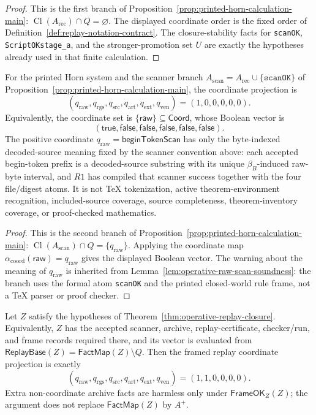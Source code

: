 \documentclass[runningheads]{llncs}
\newcommand{\FactMap}{\mathsf{FactMap}}
\newcommand{\ReplayBase}{\mathsf{ReplayBase}}
\newcommand{\FrameOKZ}{\mathsf{FrameOK}_{Z}}
\newcommand{\rawBeginTokenCoord}{q_{\mathrm{raw}}}
\newcommand{\beginTokenScan}{\mathsf{beginTokenScan}}
\newcommand{\qlex}{\rawBeginTokenCoord}
\newcommand{\qrgs}{q_{\mathrm{rgs}}}
\newcommand{\qsrc}{q_{\mathrm{src}}}
\newcommand{\qart}{q_{\mathrm{art}}}
\newcommand{\qext}{q_{\mathrm{ext}}}
\newcommand{\qven}{q_{\mathrm{ven}}}
\newcommand{\Coord}{\mathsf{Coord}}
\newcommand{\coordAtom}{\alpha_{\mathrm{coord}}}
\begin{document}
\begin{proof}
This is the first branch of
Proposition~\ref{prop:printed-horn-calculation-main}:
\(\operatorname{Cl}(A_{\mathrm{rec}})\cap Q=\varnothing\).  The displayed
coordinate order is the fixed order of Definition~\ref{def:replay-notation-contract}.
The closure-stability facts for \texttt{scanOK}, \texttt{ScriptOKstage\_a}, and
the stronger-promotion set \(U\) are exactly the hypotheses already used in that
finite calculation.
\end{proof}

\begin{corollary}
\label{prop:coordinate-statement-scanner}
For the printed Horn system and the scanner branch
\(A_{\mathrm{scan}}=A_{\mathrm{rec}}\cup\{\texttt{scanOK}\}\) of
Proposition~\ref{prop:printed-horn-calculation-main}, the coordinate projection
is
\[
(\qlex,\qrgs,\qsrc,\qart,\qext,\qven)=(1,0,0,0,0,0).
\]
Equivalently, the coordinate set is \(\{\mathsf{raw}\}\subseteq\Coord\), whose
Boolean vector is
\[
(\mathsf{true},\mathsf{false},\mathsf{false},\mathsf{false},
\mathsf{false},\mathsf{false}).
\]
The positive coordinate \(\qlex=\beginTokenScan\) has only the
byte-indexed decoded-source meaning fixed by the scanner convention above: each
accepted begin-token prefix is a decoded-source substring with its unique
\(\beta_B\)-induced raw-byte interval, and \(R1\) has compiled that scanner
success together with the four file/digest atoms.  It is not \TeX{} tokenization,
active theorem-environment recognition, included-source coverage, source
completeness, theorem-inventory coverage, or proof-checked mathematics.
\end{corollary}

\begin{proof}
This is the second branch of
Proposition~\ref{prop:printed-horn-calculation-main}:
\(\operatorname{Cl}(A_{\mathrm{scan}})\cap Q=\{\qlex\}\).  Applying the
coordinate map \(\coordAtom(\mathsf{raw})=\qlex\) gives the displayed Boolean
vector.  The warning about the meaning of \(\qlex\) is inherited from
Lemma~\ref{lem:operative-raw-scan-soundness}: the branch uses the formal atom
\texttt{scanOK} and the printed closed-world rule frame, not a \TeX{} parser or
proof checker.
\end{proof}

\begin{corollary}
\label{prop:coordinate-statement-framed-replay}
Let \(Z\) satisfy the hypotheses of
Theorem~\ref{thm:operative-replay-closure}.  Equivalently, \(Z\) has the accepted
scanner, archive, replay-certificate, checker/run, and frame records required
there, and its vector is evaluated from
\(\ReplayBase(Z)=\FactMap(Z)\setminus Q\).  Then the framed replay coordinate
projection is exactly
\[
(\qlex,\qrgs,\qsrc,\qart,\qext,\qven)=(1,1,0,0,0,0).
\]
Extra non-coordinate archive facts are harmless only under \(\FrameOKZ(Z)\); the
argument does not replace \(\FactMap(Z)\) by \(A^{+}\).
\end{corollary}
\end{document}
